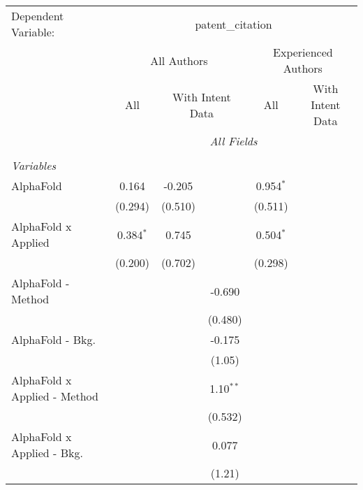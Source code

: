 \begingroup
\centering
\begin{tabular}{lcccccc}
   \tabularnewline \midrule \midrule
   Dependent Variable: & \multicolumn{6}{c}{patent\_citation}\\
 & \multicolumn{3}{c}{All Authors} & \multicolumn{3}{c}{Experienced Authors} \\
\cmidrule(lr){2-4} \cmidrule(lr){5-7}
 & \multicolumn{1}{c}{All} & \multicolumn{2}{c}{With Intent Data} & \multicolumn{1}{c}{All} & \multicolumn{2}{c}{With Intent Data} \\
\cmidrule(lr){2-2} \cmidrule(lr){3-4} \cmidrule(lr){5-5} \cmidrule(lr){6-7}
 & \multicolumn{6}{c}{\textit{All Fields}} \\ \\
   \emph{Variables}\\
   AlphaFold                      & 0.164         & -0.205       &              & 0.954$^{*}$   &        &   \\   
                                  & (0.294)       & (0.510)      &              & (0.511)       &        &   \\   
   AlphaFold x Applied            & 0.384$^{*}$   & 0.745        &              & 0.504$^{*}$   &        &   \\   
                                  & (0.200)       & (0.702)      &              & (0.298)       &        &   \\   
   AlphaFold - Method             &               &              & -0.690       &               &        &   \\   
                                  &               &              & (0.480)      &               &        &   \\   
   AlphaFold - Bkg.               &               &              & -0.175       &               &        &   \\   
                                  &               &              & (1.05)       &               &        &   \\   
   AlphaFold x Applied - Method   &               &              & 1.10$^{**}$  &               &        &   \\   
                                  &               &              & (0.532)      &               &        &   \\   
   AlphaFold x Applied - Bkg.     &               &              & 0.077        &               &        &   \\   
                                  &               &              & (1.21)       &               &        &   \\   

\end{tabular}
